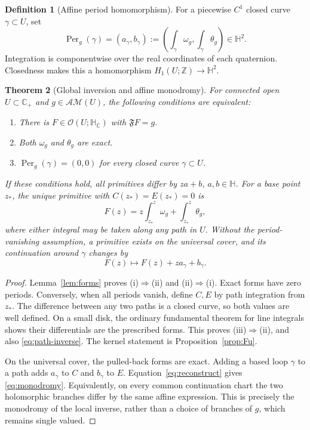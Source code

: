 \documentclass[11pt,a4paper]{article}
\numberwithin{equation}{section}
\newtheorem{theorem}{Theorem}[section]
\theoremstyle{definition}
\newtheorem{definition}[theorem]{Definition}
\theoremstyle{remark}
\newcommand{\C}{\mathbb C}
\newcommand{\HH}{\mathbb H}
\newcommand{\HC}{\mathbb H_{\C}}
\newcommand{\Cp}{\C_+}
\newcommand{\Fu}{\mathfrak F}
\newcommand{\AM}{\mathcal{AM}}
\newcommand{\Hol}{\mathcal O}
\newcommand{\Per}{\operatorname{Per}}
\newcommand{\Hone}{H_1}
\newcommand{\Z}{\mathbb Z}
\begin{document}
\begin{definition}[Affine period homomorphism]
For a piecewise $C^1$ closed curve $\gamma\subset U$, set
\begin{equation}\label{eq:Per}
 \Per_g(\gamma)=(a_\gamma,b_\gamma)
 :=\left(\int_\gamma\omega_g,\int_\gamma\theta_g\right)\in\HH^2.
\end{equation}
Integration is componentwise over the real coordinates of each
quaternion. Closedness makes this a homomorphism
$\Hone(U;\Z)\to\HH^2$.
\end{definition}

\begin{theorem}[Global inversion and affine monodromy]\label{thm:global}
For connected open $U\subset\Cp$ and $g\in\AM(U)$, the following
conditions are equivalent:
\begin{enumerate}[label=\textup{(\roman*)}]
\item There is $F\in\Hol(U;\HC)$ with $\Fu F=g$.
\item Both $\omega_g$ and $\theta_g$ are exact.
\item $\Per_g(\gamma)=(0,0)$ for every closed curve $\gamma\subset U$.
\end{enumerate}
If these conditions hold, all primitives differ by $za+b$, $a,b\in\HH$.
For a base point $z_*$, the unique primitive with $C(z_*)=E(z_*)=0$ is
\begin{equation}\label{eq:path-inverse}
 F(z)=z\int_{z_*}^{z}\omega_g+\int_{z_*}^{z}\theta_g,
\end{equation}
where either integral may be taken along any path in $U$.
Without the period-vanishing assumption, a primitive exists on the
universal cover, and its continuation around $\gamma$ changes by
\begin{equation}\label{eq:monodromy}
 F(z)\longmapsto F(z)+za_\gamma+b_\gamma.
\end{equation}
\end{theorem}
\begin{proof}
Lemma~\ref{lem:forms} proves (i)$\Rightarrow$(ii) and
(ii)$\Rightarrow$(i). Exact forms have zero periods. Conversely, when all
periods vanish, define $C,E$ by path integration from $z_*$. The difference
between any two paths is a closed curve, so both values are well defined.
On a small disk, the ordinary fundamental theorem for line integrals
shows their differentials are the prescribed forms. This proves
(iii)$\Rightarrow$(ii), and also \eqref{eq:path-inverse}.
The kernel statement is Proposition~\ref{prop:Fu}.

On the universal cover, the pulled-back forms are exact. Adding a based
loop $\gamma$ to a path adds $a_\gamma$ to $C$ and $b_\gamma$ to $E$.
Equation~\eqref{eq:reconstruct} gives \eqref{eq:monodromy}. Equivalently,
on every common continuation chart the two holomorphic branches differ
by the same affine expression. This is precisely the monodromy of the
local inverse, rather than a choice of branches of $g$, which remains
single valued.
\end{proof}
\end{document}
